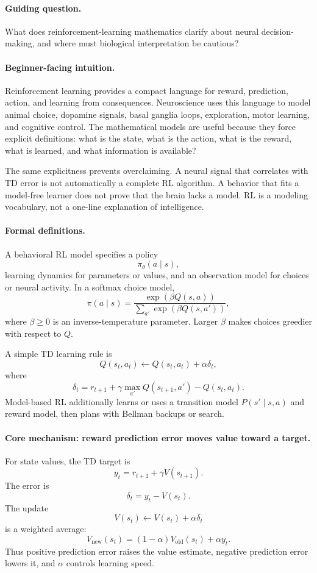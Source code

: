 \paragraph{Guiding question.}
What does reinforcement-learning mathematics clarify about neural decision-making, and where must biological interpretation be cautious?

\paragraph{Beginner-facing intuition.}
Reinforcement learning provides a compact language for reward, prediction, action, and learning from consequences. Neuroscience uses this language to model animal choice, dopamine signals, basal ganglia loops, exploration, motor learning, and cognitive control. The mathematical models are useful because they force explicit definitions: what is the state, what is the action, what is the reward, what is learned, and what information is available?

The same explicitness prevents overclaiming. A neural signal that correlates with TD error is not automatically a complete RL algorithm. A behavior that fits a model-free learner does not prove that the brain lacks a model. RL is a modeling vocabulary, not a one-line explanation of intelligence.

\paragraph{Formal definitions.}
A behavioral RL model specifies a policy
\[
\pi_\theta(a\mid s),
\]
learning dynamics for parameters or values, and an observation model for choices or neural activity. In a softmax choice model,
\[
\pi(a\mid s)=
\frac{\exp(\beta Q(s,a))}
{\sum_{a'}\exp(\beta Q(s,a'))},
\]
where \(\beta\geq0\) is an inverse-temperature parameter. Larger \(\beta\) makes choices greedier with respect to \(Q\).

A simple TD learning rule is
\[
Q(s_t,a_t)\leftarrow Q(s_t,a_t)+\alpha\delta_t,
\]
where
\[
\delta_t=r_{t+1}+\gamma\max_{a'}Q(s_{t+1},a')-Q(s_t,a_t).
\]
Model-based RL additionally learns or uses a transition model \(P(s'\mid s,a)\) and reward model, then plans with Bellman backups or search.

\paragraph{Core mechanism: reward prediction error moves value toward a target.}
For state values, the TD target is
\[
y_t=r_{t+1}+\gamma V(s_{t+1}).
\]
The error is
\[
\delta_t=y_t-V(s_t).
\]
The update
\[
V(s_t)\leftarrow V(s_t)+\alpha\delta_t
\]
is a weighted average:
\[
V_{\mathrm{new}}(s_t)=(1-\alpha)V_{\mathrm{old}}(s_t)+\alpha y_t.
\]
Thus positive prediction error raises the value estimate, negative prediction error lowers it, and \(\alpha\) controls learning speed.

